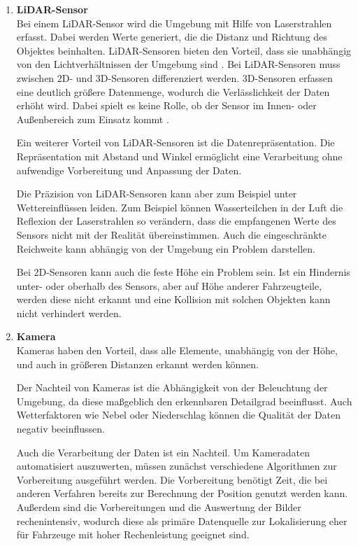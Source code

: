 \begin{enumerate}[leftmargin=*]
    \item \textbf{LiDAR-Sensor} \\
    Bei einem LiDAR-Sensor wird die Umgebung mit Hilfe von Laserstrahlen erfasst.
    Dabei werden Werte generiert, die die Distanz und Richtung des Objektes beinhalten. 
    LiDAR-Sensoren bieten den Vorteil, dass sie unabhängig von den Lichtverhältnissen der Umgebung sind \cite{lidar}. 
    Bei LiDAR-Sensoren muss zwischen 2D- und 3D-Sensoren differenziert werden. 
    3D-Sensoren erfassen eine deutlich größere Datenmenge, wodurch die Verlässlichkeit der Daten erhöht wird.
    Dabei spielt es keine Rolle, ob der Sensor im Innen- oder Außenbereich zum Einsatz kommt \cite{lidar}. 

    Ein weiterer Vorteil von LiDAR-Sensoren ist die Datenrepräsentation.
    Die Repräsentation mit Abstand und Winkel ermöglicht eine Verarbeitung ohne aufwendige Vorbereitung und Anpassung der Daten.
    
    Die Präzision von LiDAR-Sensoren kann aber zum Beispiel unter Wettereinflüssen leiden. 
    Zum Beispiel können Wasserteilchen in der Luft die Reflexion der Laserstrahlen so verändern, dass die empfangenen Werte des Sensors nicht mit der Realität übereinstimmen.
    Auch die eingeschränkte Reichweite kann abhängig von der Umgebung ein Problem darstellen.

    Bei 2D-Sensoren kann auch die feste Höhe ein Problem sein.
    Ist ein Hindernis unter- oder oberhalb des Sensors, aber auf Höhe anderer Fahrzeugteile, 
    werden diese nicht erkannt und eine Kollision mit solchen Objekten kann nicht verhindert werden. 

    \item \textbf{Kamera} \\
    Kameras haben den Vorteil, dass alle Elemente, unabhängig von der Höhe, und auch in größeren Distanzen erkannt werden können. 

    Der Nachteil von Kameras ist die Abhängigkeit von der Beleuchtung der Umgebung, da diese maßgeblich den erkennbaren Detailgrad beeinflusst.
    Auch Wetterfaktoren wie Nebel oder Niederschlag können die Qualität der Daten negativ beeinflussen.

    Auch die Verarbeitung der Daten ist ein Nachteil. 
    Um Kameradaten automatisiert auszuwerten, müssen zunächst verschiedene Algorithmen zur Vorbereitung ausgeführt werden. 
    Die Vorbereitung benötigt Zeit, die bei anderen Verfahren bereits zur Berechnung der Position genutzt werden kann.
    Außerdem sind die Vorbereitungen und die Auswertung der Bilder rechenintensiv, 
    wodurch diese als primäre Datenquelle zur Lokalisierung eher für Fahrzeuge mit hoher Rechenleistung geeignet sind.


\end{enumerate}
